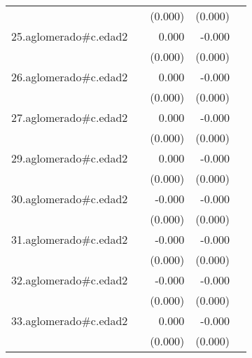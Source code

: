 {\begin{longtable}{l*{4}{D{.}{.}{-1}}}
            &                     &     (0.000)         &     (0.000)         &                     \\
\addlinespace
25.aglomerado#c.edad2&                     &       0.000         &      -0.000         &                     \\
            &                     &     (0.000)         &     (0.000)         &                     \\
\addlinespace
26.aglomerado#c.edad2&                     &       0.000         &      -0.000         &                     \\
            &                     &     (0.000)         &     (0.000)         &                     \\
\addlinespace
27.aglomerado#c.edad2&                     &       0.000         &      -0.000\sym{*}  &                     \\
            &                     &     (0.000)         &     (0.000)         &                     \\
\addlinespace
29.aglomerado#c.edad2&                     &       0.000         &      -0.000         &                     \\
            &                     &     (0.000)         &     (0.000)         &                     \\
\addlinespace
30.aglomerado#c.edad2&                     &      -0.000         &      -0.000\sym{***}&                     \\
            &                     &     (0.000)         &     (0.000)         &                     \\
\addlinespace
31.aglomerado#c.edad2&                     &      -0.000         &      -0.000\sym{***}&                     \\
            &                     &     (0.000)         &     (0.000)         &                     \\
\addlinespace
32.aglomerado#c.edad2&                     &      -0.000         &      -0.000\sym{***}&                     \\
            &                     &     (0.000)         &     (0.000)         &                     \\
\addlinespace
33.aglomerado#c.edad2&                     &       0.000         &      -0.000\sym{**} &                     \\
            &                     &     (0.000)         &     (0.000)         &                     \\

\end{longtable}}

